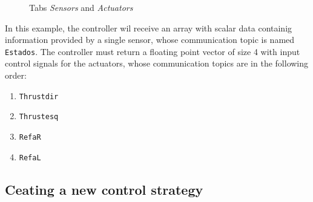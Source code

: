 \begin{figure}[h!]
	\hfill
	\hfill
	\hfill
	\caption{Tabs \textit{Sensors} and \textit{Actuators}}
	\label{abas}
\end{figure}

In this example, the controller wil receive an array with scalar data containig information provided by a single sensor, whose communication topic is named \texttt{Estados}. The controller must return a floating point vector of size 4 with input control signals for the actuators, whose communication topics are in the following order:
\begin{enumerate}
\item \texttt{Thrustdir}
\item \texttt{Thrustesq}
\item \texttt{RefaR}
\item \texttt{RefaL}
\end{enumerate}

\subsection{Ceating a new control strategy}

